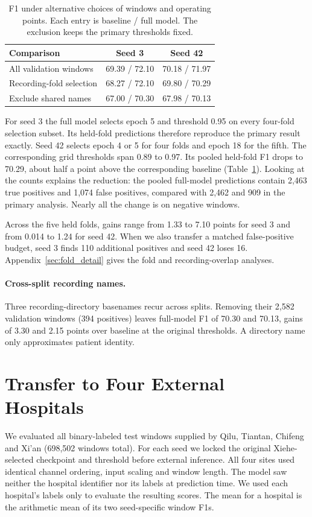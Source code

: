 \documentclass{article}
\begin{document}
\begin{table}[t]\centering\small
\caption{F1 under alternative choices of windows and operating points. Each entry is baseline / full model. The exclusion keeps the primary thresholds fixed.}\label{tab:transfer}
\begin{tabular}{lcc}\toprule
Comparison & Seed 3 & Seed 42\\\midrule
All validation windows & 69.39 / 72.10 & 70.18 / 71.97\\
Recording-fold selection & 68.27 / 72.10 & 69.80 / 70.29\\
Exclude shared names & 67.00 / 70.30 & 67.98 / 70.13\\\bottomrule
\end{tabular}
\end{table}

For seed 3 the full model selects epoch 5 and threshold 0.95 on every four-fold selection subset. Its held-fold predictions therefore reproduce the primary result exactly. Seed 42 selects epoch 4 or 5 for four folds and epoch 18 for the fifth. The corresponding grid thresholds span 0.89 to 0.97. Its pooled held-fold F1 drops to 70.29, about half a point above the corresponding baseline (Table~\ref{tab:transfer}). Looking at the counts explains the reduction: the pooled full-model predictions contain 2,463 true positives and 1,074 false positives, compared with 2,462 and 909 in the primary analysis. Nearly all the change is on negative windows.

Across the five held folds, gains range from 1.33 to 7.10 points for seed 3 and from 0.014 to 1.24 for seed 42. When we also transfer a matched false-positive budget, seed 3 finds 110 additional positives and seed 42 loses 16. Appendix~\ref{sec:fold_detail} gives the fold and recording-overlap analyses.

\paragraph{Cross-split recording names.}
Three recording-directory basenames recur across splits. Removing their 2,582 validation windows (394 positives) leaves full-model F1 of 70.30 and 70.13, gains of 3.30 and 2.15 points over baseline at the original thresholds. A directory name only approximates patient identity.

\section{Transfer to Four External Hospitals}
We evaluated all binary-labeled test windows supplied by Qilu, Tiantan, Chifeng and Xi'an (698,502 windows total). For each seed we locked the original Xiehe-selected checkpoint and threshold before external inference. All four sites used identical channel ordering, input scaling and window length. The model saw neither the hospital identifier nor its labels at prediction time. We used each hospital's labels only to evaluate the resulting scores. The mean for a hospital is the arithmetic mean of its two seed-specific window F1s.

\end{document}
